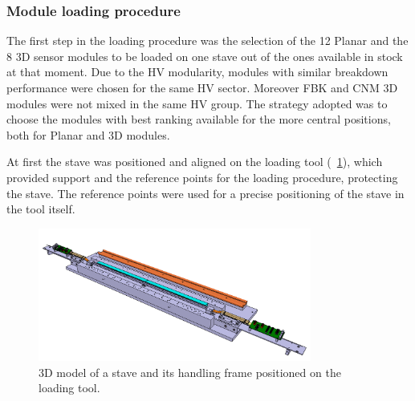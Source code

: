 
\subsubsection{Module loading procedure}
\label{subsec:LoadProc}
The first step in the loading procedure was the selection of the 12 Planar  and the 8 3D sensor modules to be loaded on one stave out of the ones available in stock at that moment. 
Due to the HV modularity, modules with similar breakdown performance were chosen for the same HV sector. Moreover FBK and CNM 3D modules were not mixed in the same HV group. The strategy adopted was to choose the modules with best ranking available for the more central positions, both for Planar  and 3D modules.

At first the stave was positioned and aligned on the loading tool (~\ref{figure:staveloadingprep}), which provided support and the reference points for the loading procedure, protecting the stave.
The reference points were used for a precise positioning of the stave in the tool itself.
\begin{figure}[h!]
\centering
        \includegraphics[width=0.8\textwidth]{Images/ibl_stave_loading/MainLoading/1.jpg}
        \caption{3D model of a stave and its handling frame positioned on the loading tool.}
        \label{figure:staveloadingprep}
\end{figure}

